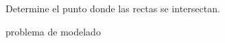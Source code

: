 \documentclass[]{srs2}
\begin{document}
\begin{preguntas}
  \pregunta Determine el punto donde las rectas se intersectan.
  \begin{malla}[7]
  \end{malla}


  \pregunta problema de modelado
  \begin{malla}[5]
  \end{malla}


\end{preguntas}
\end{document}
